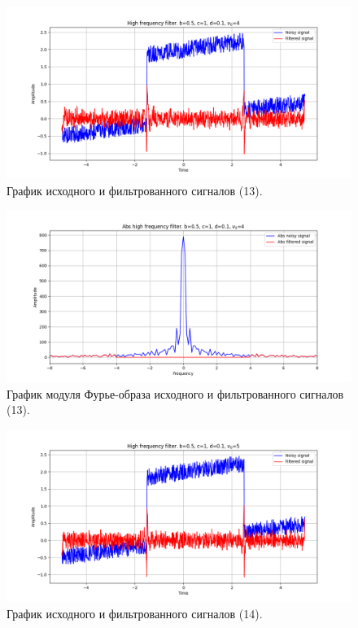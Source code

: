 \documentclass[a4paper, 12pt]{article}
\begin{document}
    \begin{figure}[!htb]
        \centering
        \includegraphics[scale=0.48]{13_u_flt_u_nolow.png}
        \captionsetup{skip=0pt}
        \caption{График исходного и фильтрованного сигналов (13).}
        \label{fig:fig51}
    \end{figure}
    \begin{figure}[!htb]
        \centering
        \includegraphics[scale=0.48]{13_abs_u_U_nolow.png}
        \captionsetup{skip=0pt}
        \caption{График модуля Фурье-образа исходного и фильтрованного сигналов (13).}
        \label{fig:fig52}
    \end{figure}
    \newpage
    \begin{figure}[!htb]
        \centering
        \includegraphics[scale=0.48]{14_u_flt_u_nolow.png}
        \captionsetup{skip=0pt}
        \caption{График исходного и фильтрованного сигналов (14).}
        \label{fig:fig53}
    \end{figure}
\end{document}
